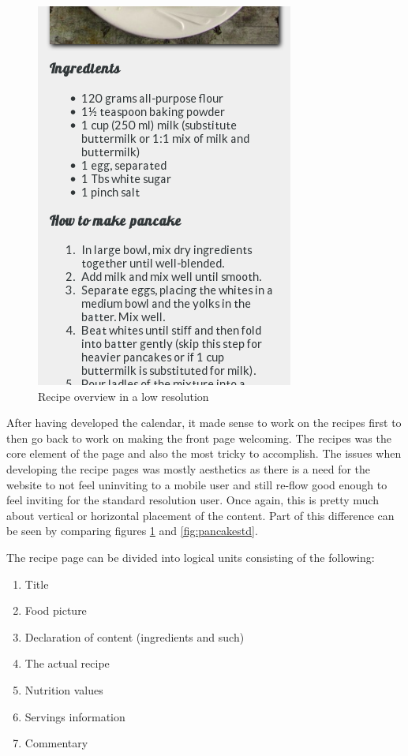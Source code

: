 \documentclass[a4paper]{scrartcl}
\begin{document}
\begin{figure}[!h]
  \begin{center}
    \includegraphics[scale=0.4]{pancakelow2.png}
    \caption{Recipe overview in a low resolution}
    \label{fig:pancakelow}
  \end{center}
\end{figure}

After having developed the calendar, it made sense to work on the recipes first to then go back to work on making the front page welcoming. The recipes was the core element of the page and also the most tricky to accomplish.
The issues when developing the recipe pages was mostly aesthetics as there is a need for the website to not feel uninviting to a mobile user and still re-flow good enough to feel inviting for the standard resolution user. Once again, this is pretty much about vertical or horizontal placement of the content. Part of this difference can be seen by comparing figures \ref{fig:pancakelow} and \ref{fig:pancakestd}.

The recipe page can be divided into logical units consisting of the following:

\begin{enumerate}
\item Title
\item Food picture
\item Declaration of content (ingredients and such)
\item The actual recipe
\item Nutrition values
\item Servings information
\item Commentary
\end{enumerate}
\end{document}
